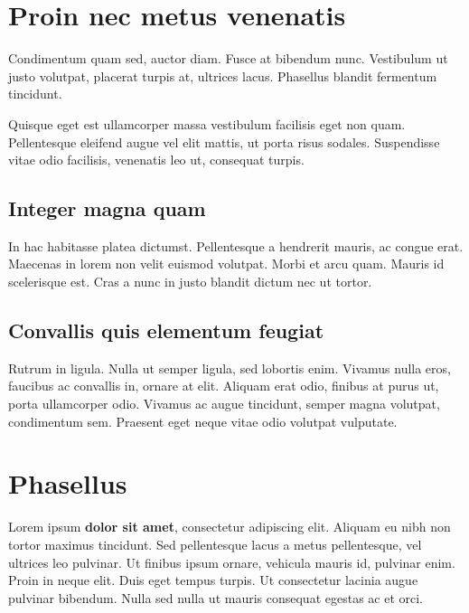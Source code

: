 \section{Proin nec metus venenatis} \label{sec:proin}

Condimentum quam sed, auctor diam. Fusce at bibendum nunc. Vestibulum ut justo
volutpat, placerat turpis at, ultrices lacus. Phasellus blandit fermentum tincidunt.

Quisque eget est ullamcorper massa vestibulum facilisis eget non quam. Pellentesque
eleifend augue vel elit mattis, ut porta risus sodales. Suspendisse vitae odio
facilisis, venenatis leo ut, consequat turpis.

\subsection{Integer magna quam}

In hac habitasse platea dictumst. Pellentesque a hendrerit mauris, ac congue
erat. Maecenas in lorem non velit euismod volutpat. Morbi et arcu quam. Mauris
id scelerisque est. Cras a nunc in justo blandit dictum nec ut tortor.


\subsection{Convallis quis elementum feugiat}

Rutrum in ligula. Nulla ut semper ligula, sed lobortis enim. Vivamus nulla eros,
faucibus ac convallis in, ornare at elit. Aliquam erat odio, finibus at purus ut,
porta ullamcorper odio. Vivamus ac augue tincidunt, semper magna volutpat,
condimentum sem. Praesent eget neque vitae odio volutpat vulputate.


\newpage 
\section{Phasellus} \label{sec:phasellus}

Lorem ipsum \textbf{dolor sit amet}, consectetur adipiscing elit. Aliquam eu nibh non
tortor maximus tincidunt. Sed pellentesque lacus a metus pellentesque, vel
ultrices leo pulvinar. Ut finibus ipsum ornare, vehicula mauris id, pulvinar
enim. Proin in neque elit. Duis eget tempus turpis. Ut consectetur lacinia
augue pulvinar bibendum. Nulla sed nulla ut mauris consequat egestas ac et orci.

